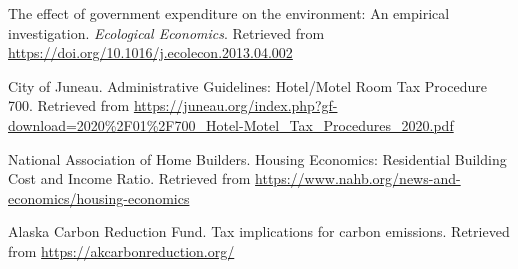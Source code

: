 \documentclass{mcmthesis}
\begin{document}
\begin{thebibliography}{99}
  The effect of government expenditure on the environment: An empirical investigation. 
  \emph{Ecological Economics}. 
  Retrieved from \url{https://doi.org/10.1016/j.ecolecon.2013.04.002}
  
  City of Juneau. 
  Administrative Guidelines: Hotel/Motel Room Tax Procedure 700. 
  Retrieved from \url{https://juneau.org/index.php?gf-download=2020%2F01%2F700_Hotel-Motel_Tax_Procedures_2020.pdf}
  
  National Association of Home Builders. 
  Housing Economics: Residential Building Cost and Income Ratio. 
  Retrieved from \url{https://www.nahb.org/news-and-economics/housing-economics}
  
  Alaska Carbon Reduction Fund. 
  Tax implications for carbon emissions. 
  Retrieved from \url{https://akcarbonreduction.org/}
  \end{thebibliography}


\newpage





% 
\end{document}
